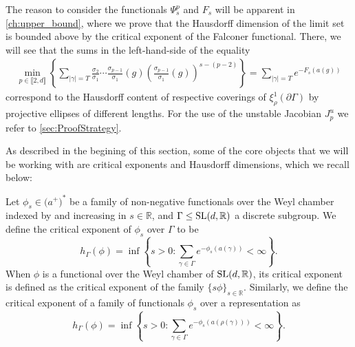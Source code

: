 \documentclass{report}
\begin{document}
\begin{remark}
    The reason to consider the functionals $\Psi_s^p$ and $F_s$ will be apparent in \cref{ch:upper_bound}, where we prove that the Hausdorff dimension of the limit set is bounded above by the critical exponent of the Falconer functional.
    There, we will see that the sums in the left-hand-side of the equality
\begin{align*}
    \min_{p \in \llbracket 2, d \rrbracket} 
    \left\{ 
        \sum_{|\gamma| = T} 
            \frac{\sigma_2}{\sigma_1}\cdots\frac{\sigma_{p-1}}{\sigma_1}(g) 
            \left( \frac{\sigma_{p-1}}{\sigma_1}(g) \right)^{s - (p-2)}
    \right\} = 
    \sum_{|\gamma| = T} e^{-F_s(a(g))}
\end{align*}
correspond to the Hausdorff content of respective coverings of $\xi_\rho^1(\partial \Gamma)$ by projective ellipses of different lengths.
For the use of the unstable Jacobian $J_p^u$ we refer to \cref{sec:ProofStrategy}.
\end{remark}

As described in the begining of this section, some of the core objects that we will be working with are critical exponents and Hausdorff dimensions, which we recall below:
\begin{definition}
    \label{def:functional_critical_exponent}
Let $\phi_s \in \mathfrak (a^+)^*$ be a family of non-negative functionals over the Weyl chamber indexed by and increasing in $s \in \mathbb R$, and $\Gamma \leq \operatorname{{\mathrm{SL}}}(d, \mathbb R)$ a discrete subgroup.
We define the critical exponent of $\phi_s$ over $\Gamma$ to be
\[
    h_\Gamma(\phi) = \inf
    \left\{
        s > 0: \sum_{\gamma \in \Gamma} e^{-\phi_s(a(\gamma))} < \infty
    \right\}.
\]    
When $\phi$ is a functional over the Weyl chamber of $\operatorname{{\mathrm{SL}}}(d, \mathbb R)$, its critical exponent is defined as the critical exponent of the family $\{s \phi\}_{s \in \mathbb R}$.
Similarly, we define the critical exponent of a family of functionals $\phi_s$ over a representation as
\[
    h_\Gamma(\phi) = \inf
    \left\{
        s > 0: \sum_{\gamma \in \Gamma} e^{-\phi_s(a(\rho(\gamma)))} < \infty
    \right\}.
\]
\end{definition}
\end{document}
